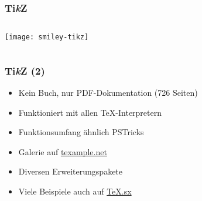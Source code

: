 \begin{frame}
  \frametitle{Ti\emph{k}Z}
  \begin{columns}[T]
    \begin{column}{.25\textwidth}
      \texttt{[image: smiley-tikz]}
    \end{column}
    \begin{column}{.75\textwidth}
      TeX}]{examples/graphics/smiley-tikz.tex}
    \end{column}
  \end{columns}
\end{frame}

\begin{frame}
  \frametitle{Ti\emph{k}Z (2)}
  \begin{itemize}
  \item Kein Buch, nur PDF-Dokumentation (726 Seiten)
  \item Funktioniert mit allen \TeX-Interpretern
  \item Funktionsumfang ähnlich PSTricks
  \item Galerie auf \href{http://www.texample.net}{texample.net}
  \item Diversen Erweiterungspakete
  \item Viele Beispiele auch auf \href{http://tex.stackexchange.com}{\TeX.sx}
  \end{itemize}
\end{frame}

